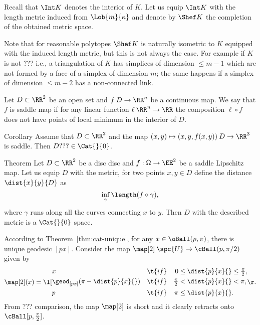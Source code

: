 Recall that $\Int K$ denotes the interior of $K$.
Let us equip $\Int K$ with the length metric induced from $\Lob{m}{\kappa}$
and denote by $\Shef K$ the completion of the obtained metric space.

Note that for reasonable polytopes $\Shef K$ is naturally isometric to $K$ equipped with the induced length metric,
but this is not always the case.
For example if $K$ is not ??? i.e., a triangulation of $K$ has simplices of dimension $\le m-1$ which are not formed by a face of a simplex of dimension $m$;
the same happens if a simplex of dimension $\le m-2$ has a non-connected link.














Let $D\subset\RR^2$ be an open set
and $f\:D\to\RR^n$ be a continuous map.
We say that $f$ is saddle map if for any linear function $\ell\:\RR^n\to\RR$ the composition $\ell\circ f$ does not have points of local 
minimum in the interior of $D$.


\begin{thm}{Corollary}
Assume that $D\subset \RR^2$ and the map 
$(x,y)\mapsto (x,y,f(x,y))\:D\to\RR^3$ is saddle.
Then $D???\in\Cat{}{0}$.
\end{thm}


\begin{thm}{Theorem}
Let $D\subset\RR^2$ be a disc
disc and $f:\Omega\to\EE^2$ be a saddle Lipschitz map.
Let us equip $D$ with the metric,
for two points $x,y\in D$ define the distance 
$\dist{x}{y}{D}$ as 
$$\inf_{\gamma}\length(f\circ\gamma),$$
where 
$\gamma$ runs along all the curves connecting $x$ to $y$.
Then $D$ with the described metric is a $\Cat{}{0}$ space.
\end{thm}












According to Theorem~\ref{thm:cat-unique}, 
for any $x\in\oBall(p,\pi)$,
there is unique geodesic $[px]$.
Consider the map $\map[2]\:\spc{U}\to\cBall(p,\pi/2)$ given by
\[
\map[2](x)
=
\l[
\begin{aligned}
&x
&&\t{if}
&0&\le\dist{p}{x}{}\le\tfrac{\pi}{2},
\\
&\geod_{[px]}(\pi-\dist{p}{x}{})
&&\t{if}
& \tfrac{\pi}{2}&<\dist{p}{x}{}<\pi,
\\
&p
&&\t{if}
& \pi&\le \dist{p}{x}{}.
\end{aligned}
\r.
\]
From ??? comparison, the map $\map[2]$ is short and it clearly retracts onto $\cBall[p,\tfrac{\pi}{2}]$.

